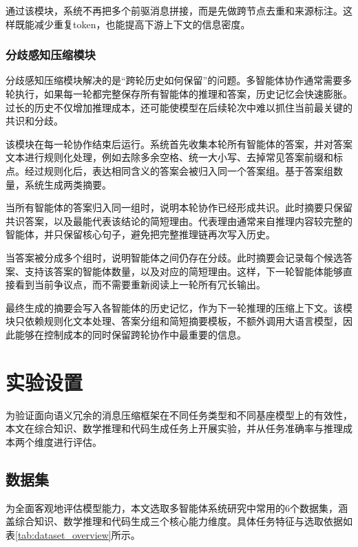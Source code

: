 通过该模块，系统不再把多个前驱消息拼接，而是先做跨节点去重和来源标注。这样既能减少重复token，也能提高下游上下文的信息密度。

\subsubsection{分歧感知压缩模块}

分歧感知压缩模块解决的是“跨轮历史如何保留”的问题。多智能体协作通常需要多轮执行，如果每一轮都完整保存所有智能体的推理和答案，历史记忆会快速膨胀。过长的历史不仅增加推理成本，还可能使模型在后续轮次中难以抓住当前最关键的共识和分歧。

该模块在每一轮协作结束后运行。系统首先收集本轮所有智能体的答案，并对答案文本进行规则化处理，例如去除多余空格、统一大小写、去掉常见答案前缀和标点。经过规则化后，表达相同含义的答案会被归入同一个答案组。基于答案组数量，系统生成两类摘要。

当所有智能体的答案归入同一组时，说明本轮协作已经形成共识。此时摘要只保留共识答案，以及最能代表该结论的简短理由。代表理由通常来自推理内容较完整的智能体，并只保留核心句子，避免把完整推理链再次写入历史。

当答案被分成多个组时，说明智能体之间仍存在分歧。此时摘要会记录每个候选答案、支持该答案的智能体数量，以及对应的简短理由。这样，下一轮智能体能够直接看到当前争议点，而不需要重新阅读上一轮所有冗长输出。

最终生成的摘要会写入各智能体的历史记忆，作为下一轮推理的压缩上下文。该模块只依赖规则化文本处理、答案分组和简短摘要模板，不额外调用大语言模型，因此能够在控制成本的同时保留跨轮协作中最重要的信息。


\section{实验设置}
为验证面向语义冗余的消息压缩框架在不同任务类型和不同基座模型上的有效性，本文在综合知识、数学推理和代码生成任务上开展实验，并从任务准确率与推理成本两个维度进行评估。

\subsection{数据集}
为全面客观地评估模型能力，本文选取多智能体系统研究中常用的6个数据集，涵盖综合知识、数学推理和代码生成三个核心能力维度。具体任务特征与选取依据如表\ref{tab:dataset_overview}所示。


